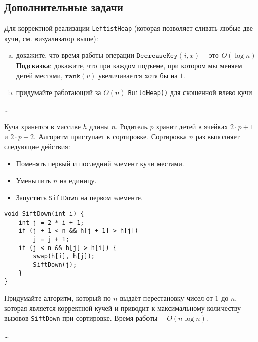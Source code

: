\subsection*{Дополнительные задачи}

\begin{problem}
    Для корректной реализации \texttt{LeftistHeap} (которая позволяет сливать любые две кучи, см. визуализатор выше):
    \begin{enumerate}[a)]
        \item докажите, что время работы операции $\mathtt{DecreaseKey}(i, x)$~-- это $O(\log n)$ \\
            {
                \footnotesize \textbf{Подсказка}: докажите, что при каждом подъеме, при котором мы меняем детей местами,
                $\mathtt{rank}(v)$ увеличивается хотя бы на $1$.
            }
        \item придумайте работающий за $O(n)$ \texttt{BuildHeap()} для скошенной влево кучи
    \end{enumerate}
\end{problem}

\begin{solution}
    \dots
\end{solution}


\begin{problem}
    Куча хранится в массиве $h$ длины $n$. Родитель $p$ хранит детей в ячейках $2 \cdot p + 1$ и $2 \cdot p + 2$.
    Алгоритм приступает к сортировке. Сортировка $n$ раз выполняет следующие действия:
    \begin{itemize}
        \item Поменять первый и последний элемент кучи местами.
        \item Уменьшить $n$ на единицу.
        \item Запустить \texttt{SiftDown} на первом элементе.
    \end{itemize}

    {
        \normalfont\begin{lstlisting}
void SiftDown(int i) {
    int j = 2 * i + 1;
    if (j + 1 < n && h[j + 1] > h[j])
        j = j + 1;
    if (j < n && h[j] > h[i]) {
        swap(h[i], h[j]);
        SiftDown(j);
    }
}
        \end{lstlisting}
    }

    Придумайте алгоритм, который по $n$ выдаёт перестановку чисел от $1$ до $n$, которая является корректной кучей
    и приводит к максимальному количеству вызовов \texttt{SiftDown} при сортировке. Время работы~-- $O(n \log n)$.
\end{problem}

\begin{solution}
    \dots
\end{solution}


\clearpage
